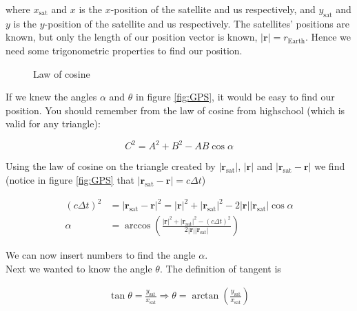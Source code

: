 \documentclass[a4paper,10pt,english]{article}
\begin{document}
\begin{enumerate}
where $x_{\text{sat}}$ and $x$ is the $x$-position of the satellite and us respectively, and $y_{\text{sat}}$ and $y$ is the $y$-position of the satellite and us respectively. The satellites' positions are known, but only the length of our position vector is known, $|\textbf{r}|=r_{\text{Earth}}$. Hence we need some trigonometric properties to find our position.

\begin{figure}[ht]
\centering
{}
\caption{Law of cosine}
\label{fig:cos}
\end{figure}

If we knew the angles $\alpha$ and $\theta$ in figure \ref{fig:GPS}, it would be easy to find our position. You should remember from the law of cosine from highschool (which is valid for any triangle):

\begin{equation}
C^{2}=A^{2}+B^{2}-AB\cos{\alpha}
\end{equation}

Using the law of cosine on the triangle created by $|\textbf{r}_{\text{sat}}|$, $|\textbf{r}|$ and $|\textbf{r}_{\text{sat}}-\textbf{r}|$ we find (notice in figure \ref{fig:GPS} that $|\textbf{r}_{\text{sat}}-\textbf{r}|=c\Delta t$)

\begin{align*}
(c\Delta t)^{2}&=|\textbf{r}_{\text{sat}}-\textbf{r}|^{2}=|\textbf{r}|^{2}+|\textbf{r}_{\text{sat}}|^{2}-2|\textbf{r}||\textbf{r}_{\text{sat}}|\cos{\alpha}\\
\alpha&=\arccos{\left(\frac{|\textbf{r}|^{2}+|\textbf{r}_{\text{sat}}|^{2}-(c\Delta t)^{2}}{2|\textbf{r}||\textbf{r}_{\text{sat}}|}\right)}
\end{align*}

We can now insert numbers to find the angle $\alpha$.
\\
Next we wanted to know the angle $\theta$. The definition of tangent is

\begin{align*}
\tan{\theta}=\frac{y_{\text{sat}}}{x_{\text{sat}}} \Rightarrow \theta=\arctan{\left(\frac{y_{\text{sat}}}{x_{\text{sat}}}\right)}
\end{align*}


\end{enumerate}
\end{document}
